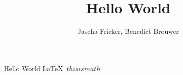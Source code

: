 \documentclass{article}
\title{Hello World}
\author{Jascha Fricker, Benedict Brouwer}
\begin{document}
    \maketitle
    Hello World \LaTeX \ $this is math$
\end{document}
